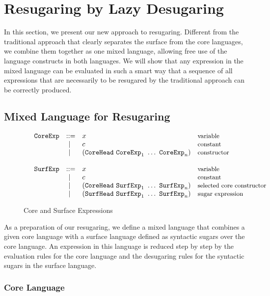 
\section{Resugaring by Lazy Desugaring}
\label{sec3}

In this section, we present our new approach to resugaring. Different from the traditional approach that clearly separates the surface from the core languages, we combine them together as one mixed language, allowing free use of the language constructs in both languages. We will show that any expression in the mixed language can be evaluated in such a smart way that a sequence of all expressions that are necessarily to be resugared by the traditional approach can be correctly produced.

\subsection{Mixed Language for Resugaring}

\begin{figure}[t]
	\[
	\begin{array}{lllll}
	 &\mbox{\tt CoreExp} &::=& x  & \mbox{{\small variable}}\\
	       &&~|~& c  & \mbox{{\small constant}}\\
				 &&~|~& (\mbox{\tt CoreHead}~\mbox{\tt CoreExp}_1~\ldots~\mbox{\tt CoreExp}_n) & \mbox{{\small constructor}}\\
	\\
	 &\mbox{\tt SurfExp} &::=& x  & \mbox{{\small variable}}\\
	       &&~|~& c  & \mbox{{\small constant}}\\
				  &&~|~& (\mbox{\tt CoreHead}~\mbox{\tt SurfExp}_1~\ldots~\mbox{\tt SurfExp}_n) & \mbox{{\small selected core constructor}}\\
					 &&~|~& (\mbox{\tt SurfHead}~\mbox{\tt SurfExp}_1~\ldots~\mbox{\tt SurfExp}_n) & \mbox{{\small sugar expression}}\\
	\end{array}
	\]
	\caption{Core and Surface Expressions}
	\label{fig:expression}
\end{figure}

As a preparation of our resugaring, we define a mixed language that combines a given core language with a surface language defined as syntactic sugars over the core language. An expression in this language is reduced step by step by the evaluation rules for the core language and the desugaring rules for the syntactic sugars in the surface language.

\subsubsection{Core Language}

